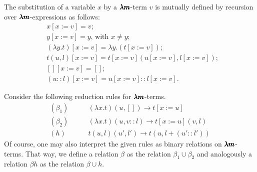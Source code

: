 \begin{definition}
  The substitution of a variable $x$ by a $\pmb{\lambda m}$-term $v$ is mutually defined by recursion over $\pmb{\lambda m}$-expressions as follows:  
  \begin{align*}
  & x[x := v] = v ; \\
  & y[x := v] = y \text{, with } x \neq y ; \\
  & (\lambda y . t)[x := v] = \lambda y . (t[x := v]) ; \\
  & t(u, l)[x := v] = t[x := v](u[x := v], l[x := v]) ; \\    
  & [][x := v] = [] ; \\
  & (u::l)[x := v] = u[x := v] :: l[x := v] .
  \end{align*}
\end{definition}


\begin{definition}
  Consider the following reduction rules for $\pmb{\lambda m}$-terms.
  \begin{align*}
    (\beta_1) & \qquad (\lambda x . t)(u, [])   \to t[x := u] \\
    (\beta_2) & \qquad (\lambda x . t)(u, v::l) \to t[x := u](v, l) \\
    (h)       & \qquad t(u, l)(u', l')          \to t(u, l + (u'::l'))
  \end{align*}
  Of course, one may also interpret the given rules as binary relations on $\pmb{\lambda m}$-terms.
  That way, we define a relation $\beta$ as the relation $\beta_1 \cup \beta_2$ and analogously a relation $\beta h$ as the relation $\beta \cup h$.
\end{definition}


